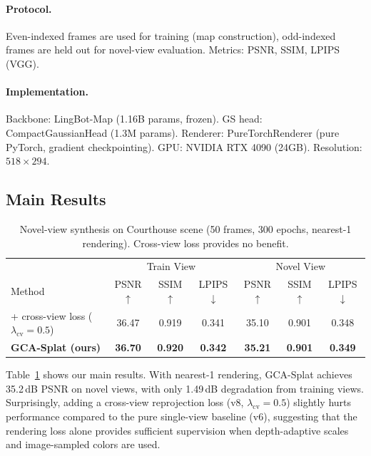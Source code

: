 \documentclass[10pt,twocolumn]{article}
\begin{document}
\paragraph{Protocol.}
Even-indexed frames are used for training (map construction), odd-indexed frames are held out for novel-view evaluation.
Metrics: PSNR, SSIM, LPIPS (VGG).

\paragraph{Implementation.}
Backbone: LingBot-Map (1.16B params, frozen).
GS head: CompactGaussianHead (1.3M params).
Renderer: PureTorchRenderer (pure PyTorch, gradient checkpointing).
GPU: NVIDIA RTX 4090 (24GB).
Resolution: $518 \times 294$.

\subsection{Main Results}

\begin{table}[t]
  \centering
  \caption{Novel-view synthesis on Courthouse scene (50 frames, 300 epochs, nearest-1 rendering). Cross-view loss provides no benefit.}
  \label{tab:main}
  \begin{tabular}{l|ccc|ccc}
    \toprule
    & \multicolumn{3}{c|}{Train View} & \multicolumn{3}{c}{Novel View} \\
    Method & PSNR$\uparrow$ & SSIM$\uparrow$ & LPIPS$\downarrow$
           & PSNR$\uparrow$ & SSIM$\uparrow$ & LPIPS$\downarrow$ \\
    \midrule
    + cross-view loss ($\lambda_{\text{cv}}{=}0.5$) & 36.47 & 0.919 & 0.341 & 35.10 & 0.901 & 0.348 \\
    \textbf{GCA-Splat (ours)} & \textbf{36.70} & \textbf{0.920} & \textbf{0.342} & \textbf{35.21} & \textbf{0.901} & \textbf{0.349} \\
    \bottomrule
  \end{tabular}
\end{table}

Table~\ref{tab:main} shows our main results.
With nearest-1 rendering, GCA-Splat achieves 35.2\,dB PSNR on novel views, with only 1.49\,dB degradation from training views.
Surprisingly, adding a cross-view reprojection loss (v8, $\lambda_{\text{cv}}{=}0.5$) slightly hurts performance compared to the pure single-view baseline (v6), suggesting that the rendering loss alone provides sufficient supervision when depth-adaptive scales and image-sampled colors are used.
\end{document}
